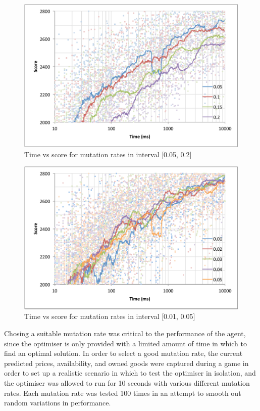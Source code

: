 \documentclass[a4paper]{proc}
\begin{document}
\begin{figure}
  \includegraphics[width=\linewidth]{mutation_rate_2.pdf}
  \caption{Time vs score for mutation rates in interval [0.05, 0.2]}
  \label{fig:mutation_rate_2}
\end{figure}

\begin{figure}
  \includegraphics[width=\linewidth]{mutation_rate_3.pdf}
  \caption{Time vs score for mutation rates in interval [0.01, 0.05]}
  \label{fig:mutation_rate_3}
\end{figure}

Chosing a suitable mutation rate was critical to the performance of the agent, since the optimiser is only provided with a limited amount of time in which to find an optimal solution. In order to select a good mutation rate, the current predicted prices, availability, and owned goods were captured during a game in order to set up a realistic scenario in which to test the optimiser in isolation, and the optimiser was allowed to run for 10 seconds with various different mutation rates. Each mutation rate was tested 100 times in an attempt to smooth out random variations in performance.
\end{document}
